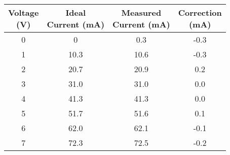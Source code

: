 \begin{tabular}{ | c | c | c | c | } \hline

	\thead{Voltage \\ (V)} & \thead{Ideal \\ Current (mA)} & \thead{Measured \\ Current (mA)} & \thead{Correction \\ (mA)} \\ \hline
	
	0 & 0    & 0.3  & -0.3 \\ \hline
	1 & 10.3 & 10.6 & -0.3 \\ \hline
	2 & 20.7 & 20.9 & 0.2  \\ \hline
	3 & 31.0 & 31.0 & 0.0  \\ \hline
	4 & 41.3 & 41.3 & 0.0  \\ \hline
	5 & 51.7 & 51.6 & 0.1  \\ \hline
	6 & 62.0 & 62.1 & -0.1 \\ \hline
	7 & 72.3 & 72.5 & -0.2 \\ \hline

\end{tabular}